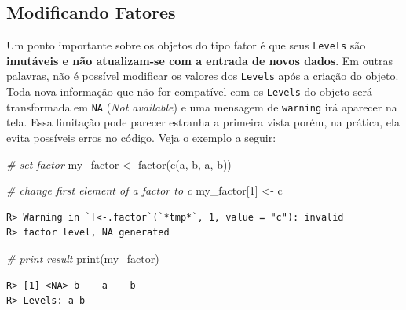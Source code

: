 \documentclass[
  11pt,
]{book}
\newenvironment{Shaded}{\begin{snugshade}}{\end{snugshade}}
\newcommand{\CommentTok}[1]{\textcolor[rgb]{0.37,0.37,0.37}{\textit{#1}}}
\newcommand{\DecValTok}[1]{\textcolor[rgb]{0.06,0.06,0.06}{#1}}
\newcommand{\FunctionTok}[1]{\textcolor[rgb]{0,0,0}{#1}}
\newcommand{\NormalTok}[1]{#1}
\newcommand{\OtherTok}[1]{\textcolor[rgb]{0.37,0.37,0.37}{#1}}
\newcommand{\StringTok}[1]{\textcolor[rgb]{0.5,0.5,0.5}{#1}}
\begin{document}
\hypertarget{modificando-fatores}{%
\subsection{Modificando Fatores}\label{modificando-fatores}}

Um ponto importante sobre os objetos do tipo fator é que seus \texttt{Levels} são \textbf{imutáveis e não atualizam-se com a entrada de novos dados}. Em outras palavras, não é possível modificar os valores dos \texttt{Levels} após a criação do objeto. Toda nova informação que não for compatível com os \texttt{Levels} do objeto será transformada em \texttt{NA} (\emph{Not available}) e uma mensagem de \texttt{warning} irá aparecer na tela. Essa limitação pode parecer estranha a primeira vista porém, na prática, ela evita possíveis erros no código. Veja o exemplo a seguir:

\begin{Shaded}
\begin{Highlighting}[]
\CommentTok{\# set factor}
\NormalTok{my\_factor }\OtherTok{\textless{}{-}} \FunctionTok{factor}\NormalTok{(}\FunctionTok{c}\NormalTok{(}\StringTok{\textquotesingle{}a\textquotesingle{}}\NormalTok{, }\StringTok{\textquotesingle{}b\textquotesingle{}}\NormalTok{, }\StringTok{\textquotesingle{}a\textquotesingle{}}\NormalTok{, }\StringTok{\textquotesingle{}b\textquotesingle{}}\NormalTok{))}

\CommentTok{\# change first element of a factor to \textquotesingle{}c\textquotesingle{}}
\NormalTok{my\_factor[}\DecValTok{1}\NormalTok{] }\OtherTok{\textless{}{-}} \StringTok{\textquotesingle{}c\textquotesingle{}}
\end{Highlighting}
\end{Shaded}

\begin{verbatim}
R> Warning in `[<-.factor`(`*tmp*`, 1, value = "c"): invalid
R> factor level, NA generated
\end{verbatim}

\begin{Shaded}
\begin{Highlighting}[]
\CommentTok{\# print result}
\FunctionTok{print}\NormalTok{(my\_factor)}
\end{Highlighting}
\end{Shaded}

\begin{verbatim}
R> [1] <NA> b    a    b   
R> Levels: a b
\end{verbatim}
\end{document}
